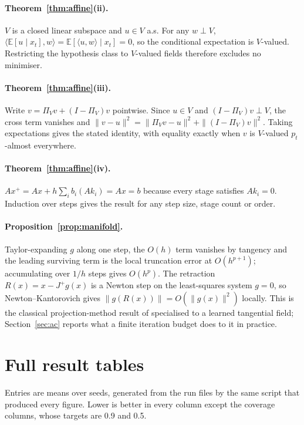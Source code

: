 \documentclass{article}
\begin{document}
\paragraph{Theorem~\ref{thm:affine}(ii).} $V$ is a closed linear subspace and
$u\in V$ a.s. For any $w\perp V$, $\langle\mathbb E[u\mid x_t],w\rangle
=\mathbb E[\langle u,w\rangle\mid x_t]=0$, so the conditional expectation is
$V$-valued. Restricting the hypothesis class to $V$-valued fields therefore excludes no
minimiser.
\paragraph{Theorem~\ref{thm:affine}(iii).} Write $v=\Pi_Vv+(I-\Pi_V)v$
pointwise. Since $u\in V$ and $(I-\Pi_V)v\perp V$, the cross term vanishes and
$\|v-u\|^2=\|\Pi_Vv-u\|^2+\|(I-\Pi_V)v\|^2$. Taking expectations gives the stated
identity, with equality exactly when $v$ is $V$-valued $p_t$-almost everywhere.
\paragraph{Theorem~\ref{thm:affine}(iv).} $Ax^{+}=Ax+h\sum_ib_i(Ak_i)=Ax=b$
because every stage satisfies $Ak_i=0$. Induction over steps gives the result for any
step size, stage count or order.

\paragraph{Proposition~\ref{prop:manifold}.} Taylor-expanding $g$ along one
step, the $O(h)$ term vanishes by tangency and the leading surviving term is the local
truncation error at $O(h^{p+1})$; accumulating over $1/h$ steps gives $O(h^{p})$. The
retraction $R(x)=x-J^{+}g(x)$ is a Newton step on the least-squares system $g=0$, so
Newton--Kantorovich gives $\|g(R(x))\|=O(\|g(x)\|^2)$ locally. This is the classical
projection-method result of \citet{hairer2006geometric} specialised to a learned
tangential field; Section~\ref{sec:ac} reports what a finite iteration budget does to
it in practice.

\section{Full result tables}\label{app:full}
Entries are means over seeds, generated from the run files by the same script
that produced every figure. Lower is better in every column except the coverage
columns, whose targets are 0.9 and 0.5.
\end{document}
